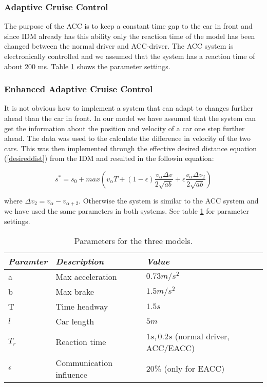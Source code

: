 \subsubsection{Adaptive Cruise Control}
The purpose of the ACC is to keep a constant time gap to the car in front
and since IDM already has this ability only the reaction time of the model
has been changed between the normal driver and ACC-driver. The ACC system
is electronically controlled and we assumed that the system has a reaction
time of about 200 ms. Table \ref{config} shows the parameter settings.

\subsubsection{Enhanced Adaptive Cruise Control}
It is not obvious how to implement a system that can adapt to changes further
ahead than the car in front. In our model we have assumed that the system
can get the information about the position and velocity of a car one step further
ahead. The data was used to the calculate the difference
in velocity of the two cars. This was then implemented through the effective desired
distance equation (\ref{desireddist}) from the IDM and resulted in the followin equation:
 
\begin{equation}
s^\ast = s_0 + max \left (v_\alpha T + (1-\epsilon
)\frac{v_\alpha \Delta v}{2\sqrt{ab}} + \epsilon \frac{v_\alpha \Delta
v_2}{2\sqrt{ab}}\right )
\end{equation}

where $ \Delta v_2 = v_\alpha - v_{\alpha +2} $. Otherwise the system is
similar to the ACC system and we have used the same parameters in both
systems. See table \ref{config} for parameter settings.

\begin{center}
\begin{table}[H]
\begin{tabular}{| l | l | l |} \hline
\emph{Paramter} & \emph{Description} & \emph{Value}\\ \hline
a & Max acceleration & $ 0.73 \unit{m/s^2} $\\ \hline
b & Max brake & $ 1.5 \unit{m/s^2} $\\ \hline
T & Time headway & $ 1.5 \unit{s} $ \\ \hline
$ l $ & Car length & $ 5 \unit{m} $ \\ \hline
$ T_r $ & Reaction time & $ 1 \unit{s}, 0.2 \unit{s} $ (normal driver, ACC/EACC) \\ \hline
$ \epsilon $ & Communication influence & $ 20 \% $ (only for EACC) \\ \hline
\end{tabular}
\caption{\label{config} Parameters for the three models.}
\end{table}
\end{center}


